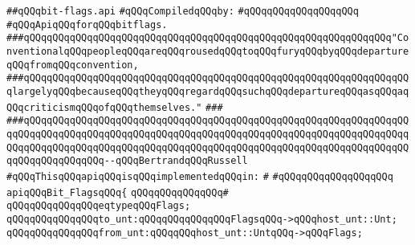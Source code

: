 \label{src/lib/std/src/bit-flags.api}
\verb|##qQQqbit-flags.api|\newline
\newline
\verb|#qQQqCompiledqQQqby:|\newline
\verb|#qQQqqQQqqQQqqQQqqQQq|\newline
\newline
\newline
\verb|#qQQqApiqQQqforqQQqbitflags.|\newline
\newline
\newline
\newline
\verb|###qQQqqQQqqQQqqQQqqQQqqQQqqQQqqQQqqQQqqQQqqQQqqQQqqQQqqQQqqQQqqQQq"ConventionalqQQqpeopleqQQqareqQQqrousedqQQqtoqQQqfuryqQQqbyqQQqdepartureqQQqfromqQQqconvention,|\newline
\verb|###qQQqqQQqqQQqqQQqqQQqqQQqqQQqqQQqqQQqqQQqqQQqqQQqqQQqqQQqqQQqqQQqqQQqlargelyqQQqbecauseqQQqtheyqQQqregardqQQqsuchqQQqdepartureqQQqasqQQqaqQQqcriticismqQQqofqQQqthemselves."|\newline
\verb|###|\newline
\verb|###qQQqqQQqqQQqqQQqqQQqqQQqqQQqqQQqqQQqqQQqqQQqqQQqqQQqqQQqqQQqqQQqqQQqqQQqqQQqqQQqqQQqqQQqqQQqqQQqqQQqqQQqqQQqqQQqqQQqqQQqqQQqqQQqqQQqqQQqqQQqqQQqqQQqqQQqqQQqqQQqqQQqqQQqqQQqqQQqqQQqqQQqqQQqqQQqqQQqqQQqqQQqqQQqqQQqqQQqqQQqqQQq--qQQqBertrandqQQqRussell|\newline
\newline
\newline
\newline
\verb|#qQQqThisqQQqapiqQQqisqQQqimplementedqQQqin:|\newline
\verb|#|\newline
\verb|#qQQqqQQqqQQqqQQqqQQq|\newline
\newline
\verb|apiqQQqBit_FlagsqQQq{|\newline
\verb|qQQqqQQqqQQqqQQq#|\newline
\verb|qQQqqQQqqQQqqQQqeqtypeqQQqFlags;|\newline
\newline
\verb|qQQqqQQqqQQqqQQqto_unt:qQQqqQQqqQQqqQQqFlagsqQQq->qQQqhost_unt::Unt;|\newline
\verb|qQQqqQQqqQQqqQQqfrom_unt:qQQqqQQqhost_unt::UntqQQq->qQQqFlags;|\newline
\newline
